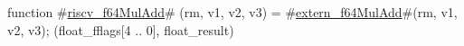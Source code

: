 function #\hyperref[sailRISCVzriscvzyf64MulAdd]{riscv\_f64MulAdd}# (rm, v1, v2, v3) = {
  #\hyperref[sailRISCVzexternzyf64MulAdd]{extern\_f64MulAdd}#(rm, v1, v2, v3);
  (float_fflags[4 .. 0], float_result)
}
